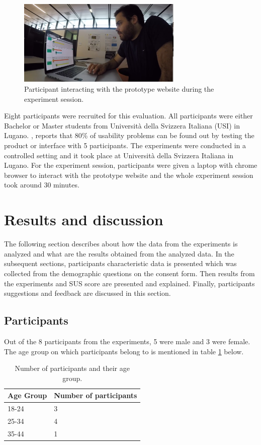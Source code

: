 \documentclass[mscthesis]{usiinfthesis}
\begin{document}
\begin{figure}[!ht]
  \centering
  \includegraphics[width=0.7\textwidth]{Partic}
  \caption{Participant interacting with the prototype website during the experiment session.}
  \label{fig16}
\end{figure}
Eight participants were recruited for this evaluation. All participants were either Bachelor or Master students from Università della Svizzera Italiana (USI) in Lugano. \citeauthor{nielsen_jakob_why_2000}, reports that 80\% of usability problems can be found out by testing the product or interface with 5 participants. The experiments were conducted in a controlled setting and it took place at Università della Svizzera Italiana in Lugano. For the experiment session, participants were given a laptop with chrome browser to interact with the prototype website and the whole experiment session took around 30 minutes. 

\section{Results and discussion}
The following section describes about how the data from the experiments is analyzed and what are the results obtained from the analyzed data. In the subsequent sections, participants characteristic data is presented which was collected from the demographic questions on the consent form. Then results from the experiments and SUS score are presented and explained. Finally, participants suggestions and feedback are discussed in this section.

\subsection{Participants}

Out of the 8 participants from the experiments, 5 were male and 3 were female. The age group on which participants belong to is mentioned in table \ref{tab3} below.


\begin{table}[!ht]
\centering
\begin{tabular}{|l|l|}
\hline
Age Group & Number of participants \\ \hline
18-24     & 3                      \\ \hline
25-34     & 4                      \\ \hline
35-44     & 1                      \\ \hline
\end{tabular}
\caption{Number of participants and their age group.}
\label{tab3}
\end{table}
\end{document}
